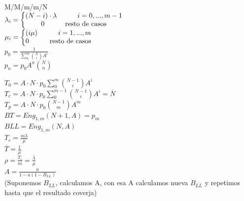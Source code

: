 \begin{minipage}{.22\textwidth}
	M/M/m/m/N \\
	$\lambda_i = \left \{  \begin{matrix} (N-i) \cdot \lambda \hskip 3em i=0,...,m-1 \\
			0 \hskip 3em \text{resto de casos}\end{matrix}  \right .$ \\
	$\mu_i = \left \{  \begin{matrix} (i\mu) \hskip 3em  i=1,...,m \\
			0 \hskip 3em \text{resto de casos}\end{matrix}  \right .$ \\
	$p_0=\frac{1}{\sum_0^m{\binom{N}{i}{A^i}}}$ \\
	$p_n = p_0{A^n}\binom{N}{n}$ \\
\end{minipage}

\vfill\null
\columnbreak

\begin{minipage}{.22\textwidth}
	$T_0={A}\cdot{N}\cdot{p_0}\sum_0^m{\binom{N-1}{i}A^i}$ \\
	$T_c={A}\cdot{N}\cdot{p_0}\sum_0^{m-1}{\binom{N-1}{i}A^i}=\overline{N}$ \\
	$T_p={A}\cdot{N}\cdot{p_0}{\binom{N-1}{m}A^m}$ \\
	$B{T}=Eng_{1,m}(N+1,A)=p_m$ \\
	$B{LL}=Eng_{1,m}(N,A)$ \\
	$T_c=\frac{m{\overline{\lambda}}}{\mu}$ \\
	$\overline{T}=\frac{1}{\mu}$ \\
	$\rho=\frac{T_c}{m}=\frac{\overline{\lambda}}{\mu}$ \\
	$A=\frac{a}{1-a(1-B_{LL})}$ \\
	(Suponemos $B_{LL}$, calculamos A, con esa A calculamos nueva $B_{LL}$ y repetimos hasta que el resultado coverja) \\
\end{minipage}

